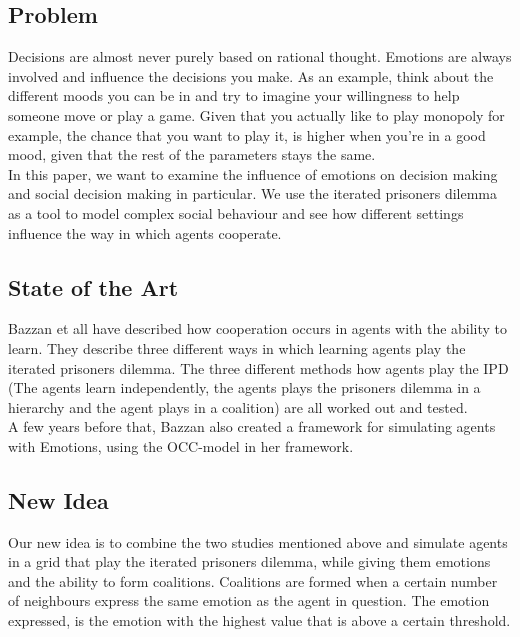 \subsection*{Problem}
Decisions are almost never purely based on rational thought. Emotions are always involved and influence the decisions you make. As an example, think about the different moods you can be in and try to imagine your willingness to help someone move or play a game. Given that you actually like to play monopoly for example, the chance that you want to play it, is higher when you're in a good mood, given that the rest of the parameters stays the same. \\
In this paper, we want to examine the influence of emotions on decision making and social decision making in particular. We use the iterated prisoners dilemma as a tool to model complex social behaviour and see how different settings influence the way in which agents cooperate.

\subsection*{State of the Art}
Bazzan et all have described how cooperation occurs in agents with the ability to learn. They describe three different ways in which learning agents play the iterated prisoners dilemma. The three different methods how agents play the IPD (The agents learn independently, the agents plays the prisoners dilemma in a hierarchy and the agent plays in a coalition) are all worked out and tested. \\
A few years before that, Bazzan also created a framework for simulating agents with Emotions, using the OCC-model in her framework. 

\subsection*{New Idea}
Our new idea is to combine the two studies mentioned above and simulate agents in a grid that play the iterated prisoners dilemma, while giving them emotions and the ability to form coalitions. Coalitions are formed when a certain number of neighbours express the same emotion as the agent in question. The emotion expressed, is the emotion with the highest value that is above a certain threshold.
